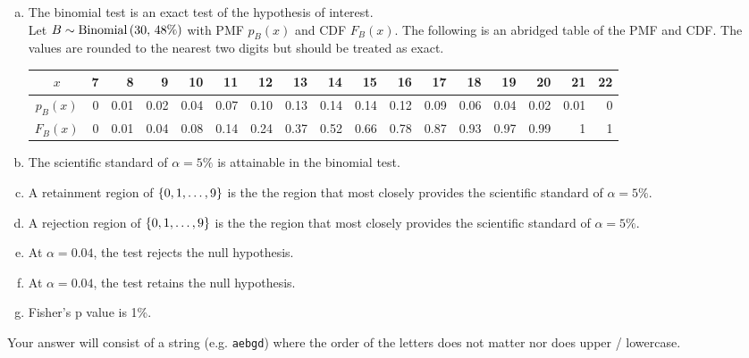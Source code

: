 \documentclass[12pt,landscape]{article}
\newcommand{\instr}{\small Your answer will consist of a string (e.g. \texttt{aebgd}) where the order of the letters does not matter nor does upper / lowercase. \normalsize}
\begin{document}
\vspace{-0.2cm}\benum{} 

\begin{enumerate}[(a)]

\item The binomial test is an exact test of the hypothesis of interest. \\

Let $B \sim \mathrm{Binomial}\left(30,\,48\%\right)$ with PMF $p_B(x)$ and CDF $F_B(x)$. The following is an abridged table of the PMF and CDF. The values are rounded to the nearest two digits but should be treated as exact.

\begin{table}[ht]
\centering
\begin{tabular}{c|rrrrrrrrrrrrrrrr}
$x$ & 7 & 8 & 9 & 10 & 11 & 12 & 13 & 14 & 15 & 16 & 17 & 18 & 19 & 20 & 21 & 22 \\ \hline
$p_B(x)$ & 0 & 0.01 & 0.02 & 0.04 & 0.07 & 0.10 & 0.13 & 0.14 & 0.14 & 0.12 & 0.09 & 0.06 & 0.04 & 0.02 & 0.01 & 0 \\ 
$F_B(x)$ & 0 & 0.01 & 0.04 & 0.08 & 0.14 & 0.24 & 0.37 & 0.52 & 0.66 & 0.78 & 0.87 & 0.93 & 0.97 & 0.99 & 1 & 1 \\ 
   \hline
\end{tabular}
\end{table}

\item The scientific standard of $\alpha = 5\%$ is attainable in the binomial test. 
\item A retainment region of $\left\{0, 1, \ldots, 9\right\}$ is the the region that most closely provides the scientific standard of $\alpha = 5\%$.
\item A rejection region of $\left\{0, 1, \ldots, 9\right\}$ is the the region that most closely provides the scientific standard of $\alpha = 5\%$.
\item At $\alpha = 0.04$, the test rejects the null hypothesis.
\item At $\alpha = 0.04$, the test retains the null hypothesis.
\item Fisher's p value is 1\%.
\end{enumerate}
\eenum\instr\pagebreak

\end{document}
